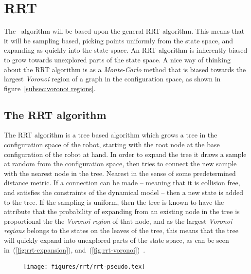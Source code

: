 \section{RRT}

The \rrtfunnel\ algorithm will be based upon the general \ac{RRT}
algorithm\cite[LaValle]{article}. This means that it will be sampling based,
picking points uniformly from the state space, and expanding as quickly into the
state-space. An \ac{RRT} algorithm is inherently biased to grow towards
unexplored parts of the state space. A nice way of thinking about the \ac{RRT}
algorithm is as a \textit{Monte-Carlo} method that is biased towards the largest
\textit{Voronoi} region of a graph in the configuration space, as shown in
figure~\ref{subsec:voronoi regions}.

\subsection{The RRT algorithm}

The \ac{RRT} algorithm is a tree based algorithm which grows a tree in the
configuration space of the robot, starting with the root node at the base
configuration of the robot at hand. In order to expand the tree it draws a
sample at random from the configuration space, then tries to connect the new
sample with the nearest node in the tree. Nearest in the sense of some
predetermined distance metric. If a connection can be made -- meaning that it is
collision free, and satisfies the constraints of the dynamical model -- then a
new state is added to the tree. If the sampling is uniform, then the tree is
known to have the attribute that the probability of expanding from an existing
node in the tree is proportional the the \textit{Voronoi region} of that node,
and as the largest \textit{Voronoi regions} belongs to the states on the leaves
of the tree, this means that the tree will quickly expand into unexplored parts
of the state space, as can be seen in~(\ref{fig:rrt-expansion}),
and~(\ref{fig:rrt-voronoi})~\cite{Lav06}.

\begin{figure}
  \centering
  \texttt{[image: figures/rrt/rrt-pseudo.tex]}
\end{figure}

